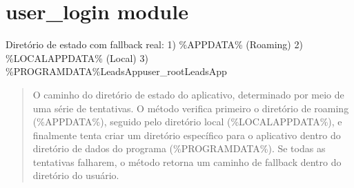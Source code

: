 \documentclass[letterpaper,10pt,english]{sphinxmanual}
\begin{document}
\begin{fulllineitems}
\begin{quote}
\begin{description}
\sphinxAtStartPar
{}

\end{description}\end{quote}

\end{fulllineitems}


\sphinxstepscope


\section{user\_login module}
\label{\detokenize{api/user_login:module-user_login}}\label{\detokenize{api/user_login:user-login-module}}\label{\detokenize{api/user_login::doc}}

\begin{fulllineitems}
\label{\detokenize{api/user_login:user_login.app_state_dir}}
\pysigstartsignatures
\pysiglinewithargsret
{}
{}
{}
\pysigstopsignatures
\sphinxAtStartPar
Diretório de estado com fallback real:
1) \%APPDATA\% (Roaming)
2) \%LOCALAPPDATA\% (Local)
3) \%PROGRAMDATA\%LeadsAppuser\_rootLeadsApp
\begin{quote}\begin{description}
\sphinxAtStartPar
O caminho do diretório de estado do aplicativo, determinado por meio de uma série de tentativas. O método verifica primeiro o diretório de roaming (\%APPDATA\%), seguido pelo diretório local (\%LOCALAPPDATA\%), e finalmente tenta criar um diretório específico para o aplicativo dentro do diretório de dados do programa (\%PROGRAMDATA\%). Se todas as tentativas falharem, o método retorna um caminho de fallback dentro do diretório do usuário.

\sphinxAtStartPar
{}

\end{description}\end{quote}

\end{fulllineitems}
\end{document}
